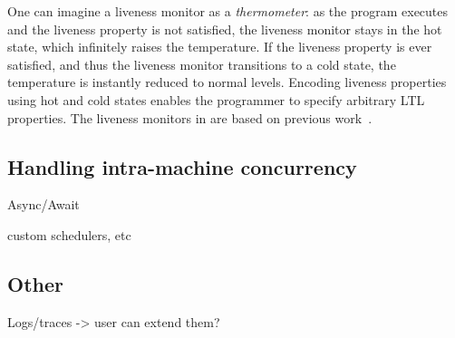 One can imagine a liveness monitor as a \emph{thermometer}: as the program executes and the liveness property is not satisfied, the liveness monitor stays in the hot state, which infinitely raises the temperature. If the liveness property is ever satisfied, and thus the liveness monitor transitions to a cold state, the temperature is instantly reduced to normal levels. Encoding liveness properties using hot and cold states enables the programmer to specify arbitrary LTL properties. The liveness monitors in \psharp are based on previous work~\cite{?}.


\subsection{Handling intra-machine concurrency}
\label{sec:psharp:async}

Async/Await

custom schedulers, etc

\subsection{Other}
\label{sec:psharp:other}

Logs/traces -> user can extend them?

